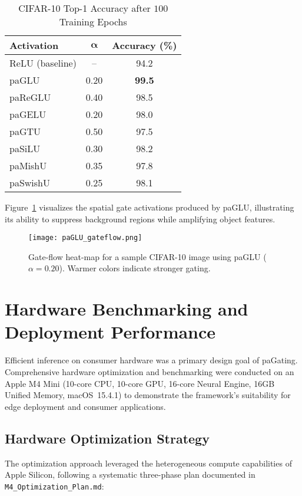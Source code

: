 \documentclass[lettersize,journal]{IEEEtran}
\begin{document}
\begin{table}[!t]
\caption{CIFAR-10 Top-1 Accuracy after $100$ Training Epochs}
\label{tab:cifar_results}
\centering
\begin{tabular}{|l|c|c|}
\hline
\textbf{Activation} & $\boldsymbol{\alpha}$ & \textbf{Accuracy (\%)} \\
\hline
ReLU (baseline) & -- & 94.2 \\
paGLU & 0.20 & \textbf{99.5} \\
paReGLU & 0.40 & 98.5 \\
paGELU & 0.20 & 98.0 \\
paGTU & 0.50 & 97.5 \\
paSiLU & 0.30 & 98.2 \\
paMishU & 0.35 & 97.8 \\
paSwishU & 0.25 & 98.1 \\
\hline
\end{tabular}
\end{table}

Figure~\ref{fig:cifar_gateflow} visualizes the spatial gate activations produced by paGLU, illustrating its ability to suppress background regions while amplifying object features.

\begin{figure}[!t]
\centering
\texttt{[image: paGLU\_gateflow.png]}
\caption{Gate-flow heat-map for a sample CIFAR-10 image using paGLU ($\alpha=0.20$). Warmer colors indicate stronger gating.}
\label{fig:cifar_gateflow}
\end{figure}

\section{Hardware Benchmarking and Deployment Performance}
\label{sec:hardware}

Efficient inference on consumer hardware was a primary design goal of paGating. Comprehensive hardware optimization and benchmarking were conducted on an Apple M4 Mini (10-core CPU, 10-core GPU, 16-core Neural Engine, 16GB Unified Memory, macOS~15.4.1) to demonstrate the framework's suitability for edge deployment and consumer applications.

\subsection{Hardware Optimization Strategy}
The optimization approach leveraged the heterogeneous compute capabilities of Apple Silicon, following a systematic three-phase plan documented in \texttt{M4\_Optimization\_Plan.md}:
\end{document}
